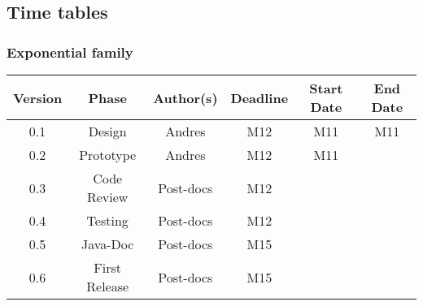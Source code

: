 \subsection{Time tables}

\subsubsection*{Exponential family}

\begin{table}[H]
\begin{tabular}{cccccc}
\hline
\textbf{Version} & \textbf{Phase} & \textbf{Author(s)} & \textbf{Deadline} & \textbf{Start Date} & \textbf{End Date}\\
\hline
0.1 & Design & Andres & M12 & M11 & M11\\
\hline 
0.2 & Prototype & Andres & M12 & M11 & \\
\hline 
0.3 & Code Review & Post-docs &  M12 &  & \\
\hline 
0.4 & Testing & Post-docs &  M12 & & \\
\hline 
0.5 & Java-Doc  & Post-docs &  M15 & & \\
\hline 
0.6 & First Release & Post-docs &  M15 & & \\
\hline
\end{tabular}
\end{table}


